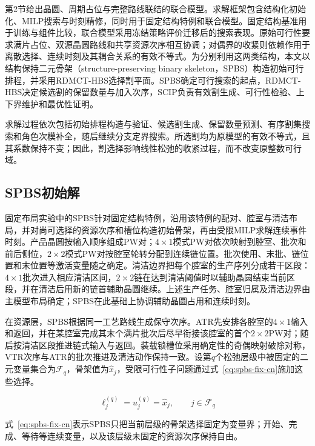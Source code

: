 \documentclass[final,5p,times,twocolumn]{elsarticle}
\newcommand{\method}{RDMCT-HBS}
\begin{document}
第2节给出晶圆、周期占位与完整路线联结的联合模型。求解框架包含结构化初始化、MILP搜索与时刻精修，同时用于固定结构特例和联合模型。固定结构基准用于训练与组件比较，联合模型采用冻结策略评价迁移后的搜索表现。原始可行性要求满片占位、双源晶圆路线和共享资源次序相互协调；对偶界的收紧则依赖作用于离散选择、连续时刻及其耦合关系的有效不等式。为分别利用这两类结构，本文以结构保持二元骨架（structure-preserving binary skeleton，SPBS）构造初始可行排程，并采用\method{}选择割平面。SPBS确定可行搜索的起点，\method{}决定候选割的保留数量与加入次序，SCIP负责有效割生成、可行性检验、上下界维护和最优性证明\citep{achterberg2009scip,bestuzheva2023scip}。

求解过程依次包括初始排程构造与验证、候选割生成、保留数量预测、有序割集搜索和角色次模补全，随后继续分支定界搜索。所选割均为原模型的有效不等式，且其系数保持不变；因此，割选择影响线性松弛的收紧过程，而不改变原整数可行域。

\subsection{SPBS初始解}

固定布局实验中的SPBS针对固定结构特例，沿用该特例的配对、腔室与清洁布局，并对尚可选择的资源次序和槽位构造初始骨架，再由受限MILP求解连续事件时刻。产品晶圆按输入顺序组成PW对；$4\times1$模式PW对依次映射到腔室、批次和前后侧位，$2\times2$模式PW对按腔室轮转分配到连续链位置。批次使用、末批、链位置和末位置等激活变量随之确定。清洁边界把每个腔室的生产序列分成若干区段：$4\times1$批次进入相应清洁区间，$2\times2$链在达到清洁阈值时以辅助晶圆结束当前区段，并在清洁后用新的链首辅助晶圆继续。上述生产任务、腔室归属及清洁边界由主模型布局确定；SPBS在此基础上协调辅助晶圆占用和连续时刻。

在资源层，SPBS根据同一工艺路线生成保守次序。ATR先安排各腔室的$4\times1$输入和返回，并在某腔室完成其末个满片批次后尽早衔接该腔室的首个$2\times2$PW对；随后按清洁区段推进链式输入与返回。装载锁槽位采用确定性的奇偶映射破除对称，VTR次序与ATR的批次推进及清洁动作保持一致。设第$q$个松弛层级中被固定的二元变量集合为$\mathcal F_q$，骨架值为$\widehat x_j$，受限可行性子问题通过式~\eqref{eq:spbs-fix-cn}施加这些选择。

\begin{equation}
\ell_j^{(q)}=u_j^{(q)}=\widehat x_j,\qquad j\in\mathcal F_q
\label{eq:spbs-fix-cn}
\end{equation}

式~\eqref{eq:spbs-fix-cn}表示SPBS只把当前层级的骨架选择固定为变量界；开始、完成、等待等连续变量，以及该层级未固定的资源次序保持自由。
\end{document}

